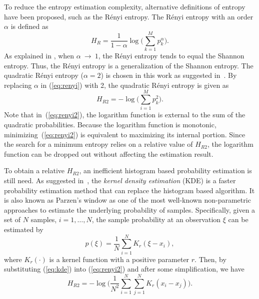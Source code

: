 \documentclass[12pt, draftclsnofoot, onecolumn]{IEEEtran}
\begin{document}
To reduce the entropy estimation complexity, alternative definitions of entropy have been proposed, such as the R\'enyi entropy.
The R\'enyi entropy  with an order \(\alpha\) is defined as \cite{renyi1961measures}
\begin{equation}
H_{R }={\frac {1}{1-\alpha }}\log {\Bigg (}\sum _{k=1}^{M}p_{k}^{\alpha }{\Bigg )}.
\label{eq:renyi}
\end{equation}
As explained in \cite{Bromiley2004}, when $\alpha~\to~1$, the R\'enyi entropy tends to equal the Shannon entropy.
Thus, the R\'enyi entropy is a generalization of the Shannon entropy.
The quadratic R\'enyi entropy ($\alpha=2$) is chosen in this work as suggested in~\cite{Santamaria2002}.
By replacing $\alpha$ in (\ref{eq:renyi}) with 2, the quadratic R\'enyi entropy is given as
\begin{equation}
H_{R2 }=-\log {\Bigg (}\sum _{i=1}^{M}p_{k}^{2 }{\Bigg )}.
\label{eq:renyi2}
\end{equation}
Note that in~(\ref{eq:renyi2}), the logarithm function is  external to the sum of the quadratic probabilities.
Because the logarithm function is monotonic, minimizing~(\ref{eq:renyi2}) is equivalent to maximizing its internal portion.
Since the search for a minimum entropy relies on a relative value of \(H_{R2 }\),
the logarithm function can be dropped out without affecting the estimation result.
% 
% 

To obtain a relative \(H_{R2 }\), an inefficient histogram based probability estimation is still need.
As suggested in~\cite{Principe2000a}, the \textit{kernel density estimation} (KDE) is a faster probability estimation method that can replace the histogram based algorithm.
It is also known as Parzen's window \cite{Parzen1962} as one of the most well-known non-parametric approaches to estimate the underlying probability of samples. 
% 
% 
Specifically, given a set of \(N\) samples, \(i=1, \dots, N\), the sample probability at an observation \(\xi\) can be estimated by
\begin{equation}
{ p(\xi)={\frac {1}{N}}\sum _{i=1}^{N}K_{r}\left(\xi-x_i\right)},
\label{eq:kde}
\end{equation}
where $K_r(\cdot)$ is a kernel function with a positive parameter $r$.
Then, by substituting (\ref{eq:kde}) into (\ref{eq:renyi2}) and after some simplification, we have
\begin{equation}
H_{R2 }=-\log {\Bigg (}\frac{1}{N^2}\sum _{i=1}^{N}\sum _{j=1}^{N}K_{r}\left(x_i-x_j\right){\Bigg )}.
\label{eq:ker_ent_est}
\end{equation}
\end{document}
